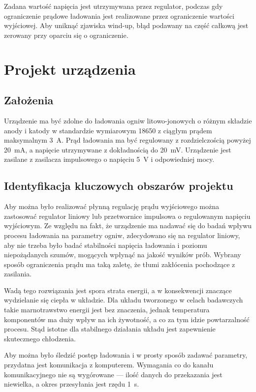 \documentclass[polish,engineer]{polsl-msth}
\begin{document}
Zadana wartość napięcia jest utrzymywana przez regulator, podczas gdy ograniczenie prądowe ładowania jest realizowane przez ograniczenie wartości wyjściowej. Aby uniknąć zjawiska wind-up, błąd podawany na część całkową jest zerowany przy oparciu się o ograniczenie.


\chapter{Projekt urządzenia}
\section{Założenia}
Urządzenie ma być zdolne do ładowania ogniw litowo-jonowych o różnym składzie anody i katody w standardzie wymiarowym 18650 z ciągłym prądem maksymalnym 3~A. Prąd ładowania ma być regulowany z rozdzielczością powyżej 20~mA, a napięcie utrzymywane z dokładnością do 20~mV. Urządzenie jest zasilane z zasilacza impulsowego o napięciu 5~V i odpowiedniej mocy.
\section{Identyfikacja kluczowych obszarów projektu}
Aby można było realizować płynną regulację prądu wyjściowego można zastosować regulator liniowy lub przetwornice impulsowa o regulowanym napięciu wyjściowym. Ze względu na fakt, że urządzenie ma nadawać się do badań wpływu procesu ładowania na parametry ogniw, zdecydowano się na regulator liniowy, aby nie trzeba było badać stabilności napięcia ładowania i poziomu niepożądanych szumów, mogących wpłynąć na jakość wyników prób. Wybrany sposób ograniczenia prądu ma taką zaletę, że tłumi zakłócenia pochodzące z zasilania.

Wadą tego rozwiązania jest spora strata energii, a w konsekwencji znaczące wydzielanie się ciepła w układzie. Dla układu tworzonego w celach badawczych takie marnotrawstwo energii jest bez znaczenia, jednak temperatura komponentów ma duży wpływ na ich żywotność, a co za tym idzie powtarzalność procesu. Stąd istotne dla stabilnego działania układu jest zapewnienie skutecznego chłodzenia.

Aby można było śledzić postęp ładowania i w prosty sposób zadawać parametry, przydatna jest komunikacja z komputerem. Wymagania co do kanału komunikacyjnego nie są wygórowane --- ilość danych do przekazania jest niewielka, a okres przesyłania jest rzędu 1~s.
\end{document}
